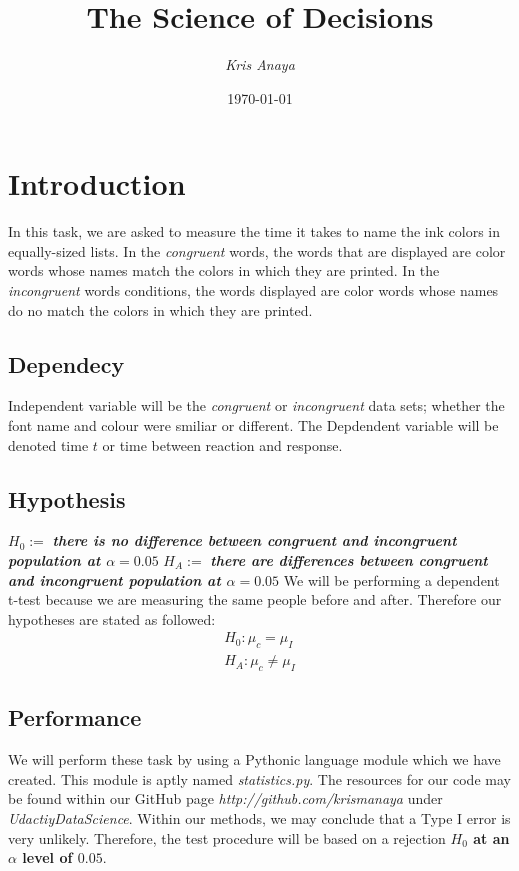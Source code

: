 \documentclass[8pt]{article}
\newcommand{\8}{\bar}
\begin{document}
 
\title{The Science of Decisions} 
\author{\textit{Kris Anaya}}
\date{\today} 
\maketitle

\section{Introduction}
In this task, we are asked to measure the time it takes to name the ink colors in equally-sized lists. In the \textit{congruent} words, the words that are displayed are color words whose names match the colors in which they are printed. In the \textit{incongruent} words conditions, the words displayed are color words whose names do no match the colors in which they are printed.
\subsection{Dependecy} 
Independent variable will be the \textit{congruent} or \textit{incongruent} data sets; whether the font name and colour were smiliar or different. The Depdendent variable will be denoted time $t$ or time between reaction and response. 
\subsection{Hypothesis} 
$H_{0} :=$ \textbf{\textit{there is no difference between \textit{congruent} and \textit{incongruent} population at $\alpha =0.05$}} \newline
$H_{A} :=$ \textbf{\textit{ there are differences between \textit{congruent} and \textit{incongruent} population at $\alpha = 0.05$}} \newline \newline
We will be performing a dependent t-test because we are measuring the same people before and after. Therefore our hypotheses are stated as followed: 
\begin{equation} 
\begin{split} 
H_{0}: \mu_{c} = \mu_{I} \\
H_{A}: \mu_{c} \not= \mu_{I} 
\end{split}
\end{equation} 
\subsection{Performance} 
\noindent We will perform these task by using a Pythonic language module which we have created. This module is aptly named \textit{statistics.py}. 
The resources for our code may be found within our GitHub page \textit{http://github.com/krismanaya} under \textit{UdactiyDataScience}.  Within our methods, we may conclude that a Type I error is very unlikely. Therefore, the test procedure will be based on a rejection \textbf{$H_{0}$ at an $\alpha$ level of $0.05$}. 
\end{document}
